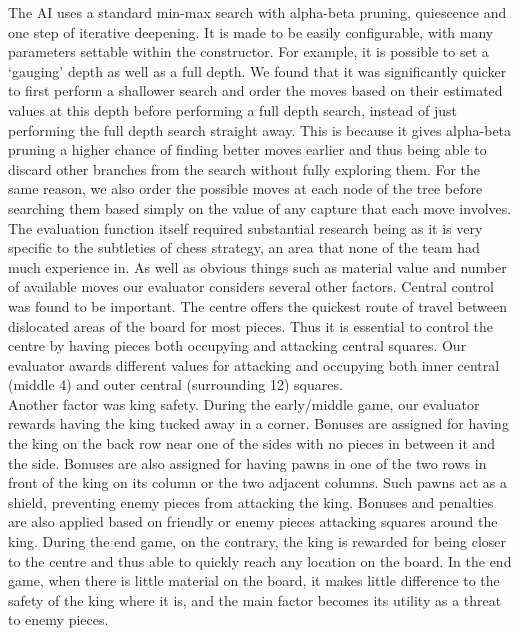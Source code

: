 \documentclass{l3proj}
\begin{document}
The AI uses a standard min-max search with alpha-beta pruning, quiescence and one step of iterative deepening. It is made to be easily configurable, with many parameters settable within the constructor. For example, it is possible to set a ‘gauging’ depth as well as a full depth. We found that it was significantly quicker to first perform a shallower search and order the moves based on their estimated values at this depth before performing a full depth search, instead of just performing the full depth search straight away. This is because it gives alpha-beta pruning a higher chance of finding better moves earlier and thus being able to discard other branches from the search without fully exploring them. For the same reason, we also order the possible moves at each node of the tree before searching them based simply on the value of any capture that each move involves. \\

The evaluation function itself required substantial research being as it is very specific to the subtleties of chess strategy, an area that none of the team had much experience in. As well as obvious things such as material value and number of available moves our evaluator considers several other factors. Central control was found to be important. The centre offers the quickest route of travel between dislocated areas of the board for most pieces. Thus it is essential to control the centre by having pieces both occupying and attacking central squares. Our evaluator awards different values for attacking and occupying both inner central (middle 4) and outer central (surrounding 12) squares.\\

Another factor was king safety. During the early/middle game, our evaluator rewards having the king tucked away in a corner. Bonuses are assigned for having the king on the back row near one of the sides with no pieces in between it and the side. Bonuses are also assigned for having pawns in one of the two rows in front of the king on its column or the two adjacent columns. Such pawns act as a shield, preventing enemy pieces from attacking the king. Bonuses and penalties are also applied based on friendly or enemy pieces attacking squares around the king. During the end game, on the contrary, the king is rewarded for being closer to the centre and thus able to quickly reach any location on the board. In the end game, when there is little material on the board, it makes little difference to the safety of the king where it is, and the main factor becomes its utility as a threat to enemy pieces.\\
\end{document}
